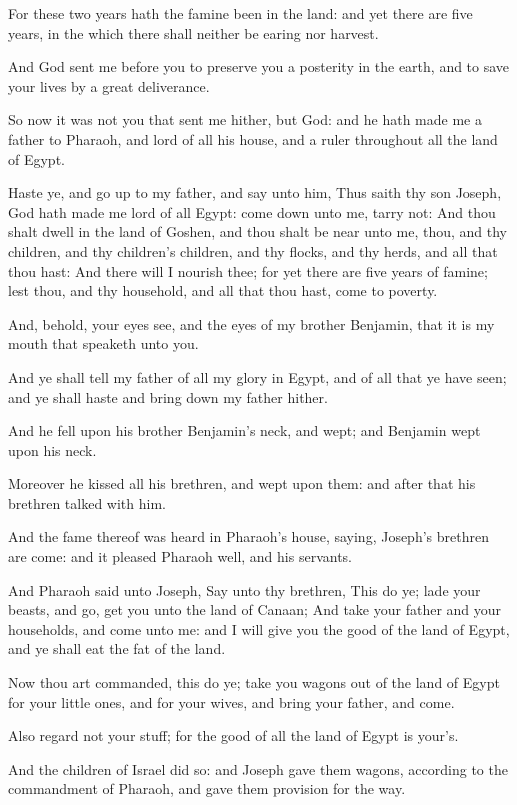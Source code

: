 \verse For these two years hath the famine been in the land: and yet
there are five years, in the which there shall neither be earing nor
harvest.

\verse And God sent me before you to preserve you a posterity in the
earth, and to save your lives by a great deliverance.

\verse So now it was not you that sent me hither, but God: and he hath
made me a father to Pharaoh, and lord of all his house, and a ruler
throughout all the land of Egypt.

\verse Haste ye, and go up to my father, and say unto him, Thus saith
thy son Joseph, God hath made me lord of all Egypt: come down unto me,
tarry not: \verse And thou shalt dwell in the land of Goshen, and thou
shalt be near unto me, thou, and thy children, and thy children's
children, and thy flocks, and thy herds, and all that thou hast: \verse
And there will I nourish thee; for yet there are five years of famine;
lest thou, and thy household, and all that thou hast, come to poverty.

\verse And, behold, your eyes see, and the eyes of my brother Benjamin,
that it is my mouth that speaketh unto you.

\verse And ye shall tell my father of all my glory in Egypt, and of all
that ye have seen; and ye shall haste and bring down my father hither.

\verse And he fell upon his brother Benjamin's neck, and wept; and
Benjamin wept upon his neck.

\verse Moreover he kissed all his brethren, and wept upon them: and
after that his brethren talked with him.

\verse And the fame thereof was heard in Pharaoh's house, saying,
Joseph's brethren are come: and it pleased Pharaoh well, and his
servants.

\verse And Pharaoh said unto Joseph, Say unto thy brethren, This do ye;
lade your beasts, and go, get you unto the land of Canaan; \verse And
take your father and your households, and come unto me: and I will
give you the good of the land of Egypt, and ye shall eat the fat of
the land.

\verse Now thou art commanded, this do ye; take you wagons out of the
land of Egypt for your little ones, and for your wives, and bring your
father, and come.

\verse Also regard not your stuff; for the good of all the land of
Egypt is your's.

\verse And the children of Israel did so: and Joseph gave them wagons,
according to the commandment of Pharaoh, and gave them provision for
the way.

